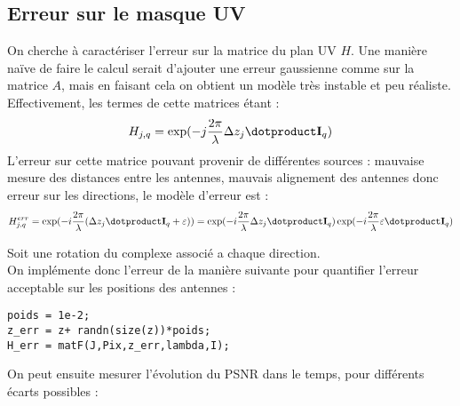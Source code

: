\documentclass[titlepage]{article}
\begin{document}
	\subsection{Erreur sur le masque UV}
	
	On cherche à caractériser l'erreur sur la matrice du plan UV $H$. Une manière naïve de faire le calcul serait d'ajouter une erreur gaussienne comme sur la matrice $A$, mais en faisant cela on obtient un modèle très instable et peu réaliste. Effectivement, les termes de cette matrices étant :
	$$
		H_{j,q} = \exp(-j\frac{2\pi}{\lambda}\Delta z_j\dotproduct\mathbf{I}_q)
	$$
	L'erreur sur cette matrice pouvant provenir de différentes sources : mauvaise mesure des distances entre les antennes, mauvais alignement des antennes donc erreur sur les directions, le modèle d'erreur est :
	$$
		H_{j,q}^{err} =  \exp(-i\frac{2\pi}{\lambda}(\Delta z_j\dotproduct\mathbf{I}_q + \varepsilon)) =  \exp(-i\frac{2\pi}{\lambda}\Delta z_j\dotproduct\mathbf{I}_q)\exp(-i\frac{2\pi}{\lambda}\varepsilon\dotproduct\mathbf{I}_q)
	$$
	
	Soit une rotation du complexe associé a chaque direction. \\
	
	On implémente donc l'erreur de la manière suivante pour quantifier l'erreur acceptable sur les positions des antennes :
	
	\begin{verbatim}
poids = 1e-2;
z_err = z+ randn(size(z))*poids;
H_err = matF(J,Pix,z_err,lambda,I);
	\end{verbatim}

	On peut ensuite mesurer l'évolution du PSNR dans le temps, pour différents écarts possibles :
	
%	
%	
	
\end{document}
